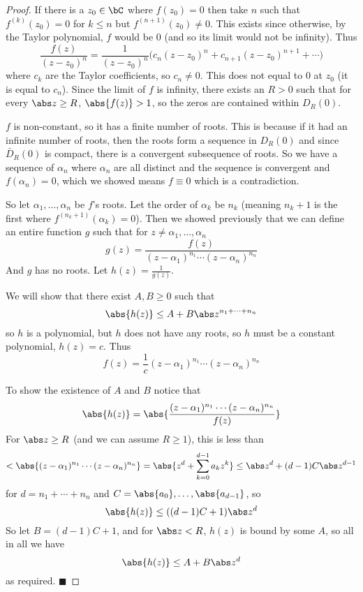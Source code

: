 \documentclass[10pt]{article}
\def\qed{\hskip1cm\hbox{}\hfill$\blacksquare$}
\begin{document}
\begin{proof}

    If there is a $z_0\in\bC$ where $f(z_0)=0$ then take $n$ such that $f^{(k)}(z_0)=0$ for $k\leq n$ but $f^{(n+1)}(z_0)\neq0$.
    This exists since otherwise, by the Taylor polynomial, $f$ would be $0$ (and so its limit would not be infinity).
    Thus
    \[ \frac{f(z)}{(z-z_0)^n} = \frac1{(z-z_0)^n}\bigl(c_n(z-z_0)^n + c_{n+1}(z-z_0)^{n+1} + \cdots\bigr) \]
    where $c_k$ are the Taylor coefficients, so $c_n\neq0$.
    This does not equal to $0$ at $z_0$ (it is equal to $c_n$).
    Since the limit of $f$ is infinity, there exists an $R>0$ such that for every $\abs z\geq R$, $\abs{f(z)}>1$, so the zeros are contained within $D_R(0)$.

    $f$ is non-constant, so it has a finite number of roots.
    This is because if it had an infinite number of roots, then the roots form a sequence in $D_R(0)$ and since $\bar D_R(0)$ is compact, there is a convergent subsequence of roots.
    So we have a sequence of $\alpha_n$ where $\alpha_n$ are all distinct and the sequence is convergent and $f(\alpha_n)=0$, which we showed means $f\equiv0$ which is a contradiction.

    So let $\alpha_1,\dots,\alpha_n$ be $f$'s roots.
    Let the order of $\alpha_k$ be $n_k$ (meaning $n_k+1$ is the first where $f^{(n_k+1)}(\alpha_k)=0$).
    Then we showed previously that we can define an entire function $g$ such that for $z\neq\alpha_1,\dots,\alpha_n$
    \[ g(z) = \frac{f(z)}{(z-\alpha_1)^{n_1}\cdots(z-\alpha_n)^{n_n}} \]
    And $g$ has no roots.
    Let $h(z)=\frac1{g(z)}$.

    We will show that there exist $A,B\geq0$ such that
    \[ \abs{h(z)} \leq A + B\abs z^{n_1+\cdots+n_n} \]
    so $h$ is a polynomial, but $h$ does not have any roots, so $h$ must be a constant polynomial, $h(z)=c$.
    Thus
    \[ f(z) = \frac1c(z-\alpha_1)^{n_1}\cdots(z-\alpha_n)^{n_n} \]

    To show the existence of $A$ and $B$ notice that
    \[ \abs{h(z)} = \abs{\frac{(z-\alpha_1)^{n_1}\cdots(z-\alpha_n)^{n_n}}{f(z)}} \]
    For $\abs z\geq R$ (and we can assume $R\geq1$), this is less than
    \[ < \abs{(z-\alpha_1)^{n_1}\cdots(z-\alpha_n)^{n_n}} = \abs{z^d + \sum_{k=0}^{d-1}a_kz^k} \leq \abs z^d + (d-1)C\abs z^{d-1} \]
    for $d=n_1+\cdots+n_n$ and $C=\maxof{\abs{a_0},\dots,\abs{a_{d-1}}}$, so
    \[ \abs{h(z)} \leq ((d-1)C+1)\abs z^d \]
    So let $B=(d-1)C+1$, and for $\abs z<R$, $h(z)$ is bound by some $A$, so all in all we have
    \[ \abs{h(z)} \leq A + B\abs z^d \]
    as required.
    \qed

\end{proof}
\end{document}
